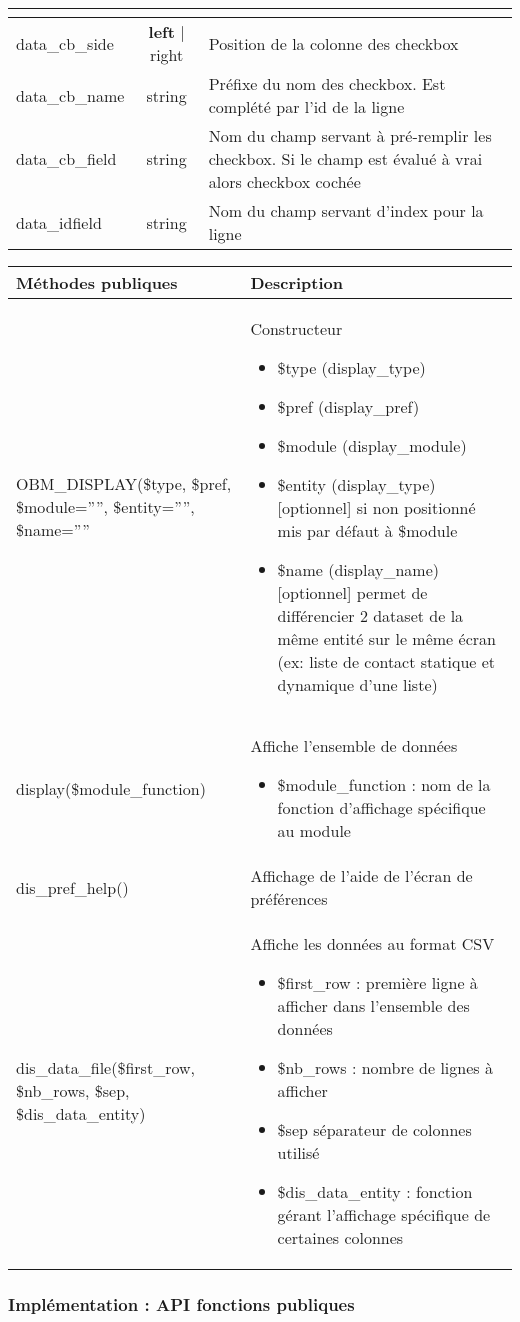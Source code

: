 \begin{longtable}{|p{3cm}|c|p{8cm}|}
\begin{itemize}
\end{itemize}
\\
\hline
data\_cb\_side & \textbf{left} | right & Position de la colonne des checkbox\\
\hline
data\_cb\_name & string & Préfixe du nom des checkbox. Est complété par l'id de la ligne\\
\hline
data\_cb\_field & string & Nom du champ servant à pré-remplir les checkbox. Si le champ est évalué à vrai alors checkbox cochée\\
\hline
data\_idfield & string & Nom du champ servant d'index pour la ligne\\
\hline
\end{longtable}


\begin{longtable}{|p{7cm}|p{8cm}|}
\hline
\textbf{Méthodes publiques} & \textbf{Description} \\
\hline
OBM\_DISPLAY(\$type, \$pref, \$module='''', \$entity='''', \$name=''''
&
Constructeur
\begin{itemize}
\item \$type (display\_type)
\item \$pref (display\_pref)
\item \$module (display\_module)
\item \$entity (display\_type) [optionnel] si non positionné mis par défaut à \$module
\item \$name (display\_name) [optionnel] permet de différencier 2 dataset de la même entité sur le même écran (ex: liste de contact statique et dynamique d'une liste)
\end{itemize}\\
\hline
display(\$module\_function) & Affiche l'ensemble de données
\begin{itemize}
\item \$module\_function : nom de la fonction d'affichage spécifique au module
\end{itemize}\\
\hline
dis\_pref\_help() & Affichage de l'aide de l'écran de préférences \\
\hline
dis\_data\_file(\$first\_row, \$nb\_rows, \$sep, \$dis\_data\_entity) & Affiche les données au format CSV
\begin{itemize}
\item \$first\_row : première ligne à afficher dans l'ensemble des données
\item \$nb\_rows : nombre de lignes à afficher
\item \$sep séparateur de colonnes utilisé
\item \$dis\_data\_entity : fonction gérant l'affichage spécifique de certaines colonnes
\end{itemize}
\\
\hline
\end{longtable}



\subsubsection{Implémentation : API fonctions publiques}
